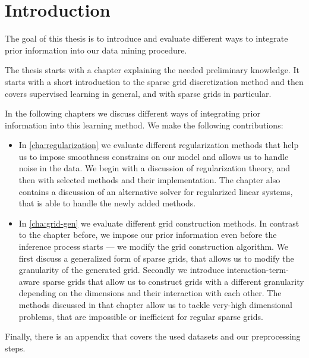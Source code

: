 \chapter{Introduction}\label{chapter:introduction}

The goal of this thesis is to introduce and evaluate different ways to integrate
prior information into our data mining procedure.

The thesis starts with a chapter explaining the needed preliminary knowledge.
It starts with a short introduction to the sparse grid discretization method and
then covers supervised learning in general, and with sparse grids in particular.

In the following chapters we discuss different ways of integrating prior information
into this learning method.
We make the following contributions:
\begin{itemize}
\item In \cref{cha:regularization} we evaluate different regularization
  methods that help us to impose smoothness constrains on our model and allows us
  to handle noise in the data.
  We begin with a discussion of regularization theory, and then with selected
  methods and their implementation.
  The chapter also contains a discussion of an alternative solver for regularized linear
  systems, that is able to handle the newly added methods.
\item In \cref{cha:grid-gen} we evaluate different grid construction methods.
  In contrast to the chapter before, we impose our prior information even before
  the inference process starts --- we modify the grid construction algorithm.
  We first discuss a generalized form of sparse grids, that allows us to modify
  the granularity of the generated grid.
  Secondly we introduce interaction-term-aware sparse grids that allow us to construct grids with a different granularity depending on the dimensions and their interaction with each other.
  The methods discussed in that chapter allow us to tackle very-high dimensional problems, that are impossible or inefficient for regular sparse grids.
\end{itemize}

Finally, there is an appendix that covers the used datasets and our preprocessing steps.

